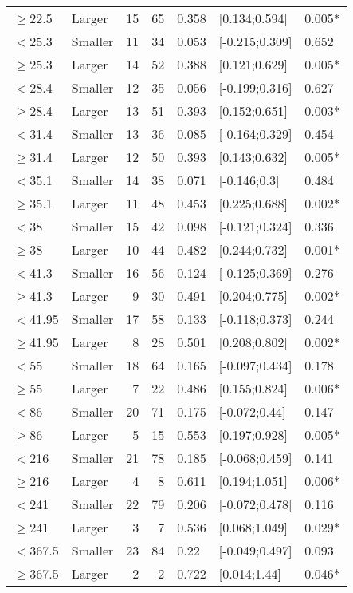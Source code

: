\documentclass{article}
\begin{document}
\begin{table}[H]
\begin{tabular}{llrrlll}
  $\ge$22.5 & Larger &  15 & 65 & 0.358 & [0.134;0.594] & 0.005* \\ 
  $<$25.3 & Smaller &  11 & 34 & 0.053 & [-0.215;0.309] & 0.652 \\ 
  $\ge$25.3 & Larger &  14 & 52 & 0.388 & [0.121;0.629] & 0.005* \\ 
  $<$28.4 & Smaller &  12 & 35 & 0.056 & [-0.199;0.316] & 0.627 \\ 
  $\ge$28.4 & Larger &  13 & 51 & 0.393 & [0.152;0.651] & 0.003* \\ 
  $<$31.4 & Smaller &  13 & 36 & 0.085 & [-0.164;0.329] & 0.454 \\ 
  $\ge$31.4 & Larger &  12 & 50 & 0.393 & [0.143;0.632] & 0.005* \\ 
  $<$35.1 & Smaller &  14 & 38 & 0.071 & [-0.146;0.3] & 0.484 \\ 
  $\ge$35.1 & Larger &  11 & 48 & 0.453 & [0.225;0.688] & 0.002* \\ 
  $<$38 & Smaller &  15 & 42 & 0.098 & [-0.121;0.324] & 0.336 \\ 
  $\ge$38 & Larger &  10 & 44 & 0.482 & [0.244;0.732] & 0.001* \\ 
  $<$41.3 & Smaller &  16 & 56 & 0.124 & [-0.125;0.369] & 0.276 \\ 
  $\ge$41.3 & Larger &   9 & 30 & 0.491 & [0.204;0.775] & 0.002* \\ 
  $<$41.95 & Smaller &  17 & 58 & 0.133 & [-0.118;0.373] & 0.244 \\ 
  $\ge$41.95 & Larger &   8 & 28 & 0.501 & [0.208;0.802] & 0.002* \\ 
  $<$55 & Smaller &  18 & 64 & 0.165 & [-0.097;0.434] & 0.178 \\ 
  $\ge$55 & Larger &   7 & 22 & 0.486 & [0.155;0.824] & 0.006* \\ 
  $<$86 & Smaller &  20 & 71 & 0.175 & [-0.072;0.44] & 0.147 \\ 
  $\ge$86 & Larger &   5 & 15 & 0.553 & [0.197;0.928] & 0.005* \\ 
  $<$216 & Smaller &  21 & 78 & 0.185 & [-0.068;0.459] & 0.141 \\ 
  $\ge$216 & Larger &   4 & 8 & 0.611 & [0.194;1.051] & 0.006* \\ 
  $<$241 & Smaller &  22 & 79 & 0.206 & [-0.072;0.478] & 0.116 \\ 
  $\ge$241 & Larger &   3 & 7 & 0.536 & [0.068;1.049] & 0.029* \\ 
  $<$367.5 & Smaller &  23 & 84 & 0.22 & [-0.049;0.497] & 0.093 \\ 
  $\ge$367.5 & Larger &   2 & 2 & 0.722 & [0.014;1.44] & 0.046* \\ 
  \hline
  \end{tabular}
  \end{table}
  \clearpage
  
\end{document}
